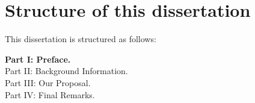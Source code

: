 
\section{Structure of this dissertation}\label{sec:intro-structure}
This dissertation is structured as follows:

\begin{description}
    \item[\textbf{Part I: Preface.}] 
    
    \item[Part II: Background Information.] 
    
    \item[Part III: Our Proposal.]
    
    \item[Part IV: Final Remarks.]
\end{description}